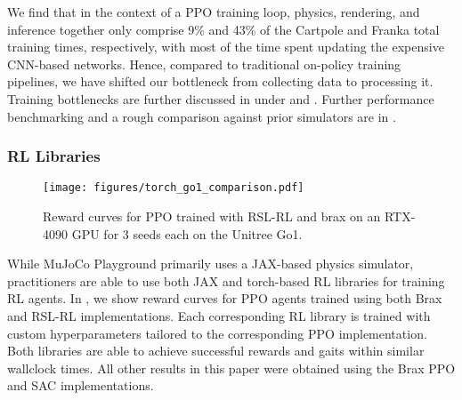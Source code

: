 We find that in the context of a PPO training loop, physics, rendering, and inference together only comprise 9\% and 43\% of the Cartpole and Franka total training times, respectively, with most of the time spent updating the expensive CNN-based networks. Hence, compared to traditional on-policy training pipelines, we have shifted our bottleneck from collecting data to processing it. Training bottlenecks are further discussed in  under  and . Further performance benchmarking and a rough comparison against prior simulators are in .

\subsubsection{RL Libraries}
\label{sec:results_different_rl_libs}

\begin{figure}[t]
    \centering
    \texttt{[image: figures/torch\_go1\_comparison.pdf]}
    \caption{\small Reward curves for PPO trained with RSL-RL and brax on an RTX-4090 GPU for 3 seeds each on the Unitree Go1.}
    \label{fig:torch_comparison_go1}
\end{figure}

While MuJoCo Playground primarily uses a JAX-based physics simulator, practitioners are able to use both JAX and torch-based RL libraries for training RL agents. In , we show reward curves for PPO agents trained using both Brax~\cite{freeman2021brax} and RSL-RL \cite{rsl_rl} implementations. Each corresponding RL library is trained with custom hyperparameters tailored to the corresponding PPO implementation. Both libraries are able to achieve successful rewards and gaits within similar wallclock times. All other results in this paper were obtained using the Brax PPO and SAC implementations.

